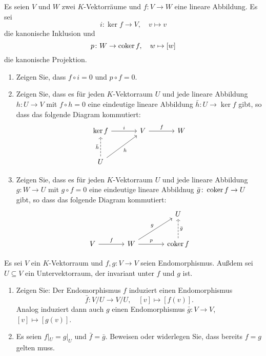 \begin{question}
  Es seien $V$ und $W$ zwei $K$-Vektorräume und $f \colon V \to W$ eine lineare Abbildung.
  Es sei
  \[
    i \colon \ker f \to V,
    \quad
    v \mapsto v
  \]
  die kanonische Inklusion und
  \[
    p \colon W \to \operatorname{coker} f,
    \quad
    w \mapsto [w]
  \]
  die kanonische Projektion.
  \begin{enumerate}[leftmargin=*]
    \item
      Zeigen Sie, dass $f \circ i = 0$ und $p \circ f = 0$.
    \item
      Zeigen Sie, dass es für jeden $K$-Vektorraum $U$ und jede lineare Abbildung $h \colon U \to V$ mit $f \circ h = 0$ eine eindeutige lineare Abbildung $\bar{h} \colon U \to \ker f$ gibt, so dass das folgende Diagram kommutiert:
      \[
        \begin{tikzcd}[row sep = large, column sep = large, ampersand replacement = \&]
                \ker f  \arrow{r}{i}
            \&  V       \arrow{r}{f}
            \&  W
          \\
                U       \arrow[swap]{ru}{h}
                        \arrow[dashed]{u}{\bar{h}}
            \&  {}
            \&  {}
        \end{tikzcd}
      \]
    \item
      Zeigen Sie, dass es für jeden $K$-Vektorraum $U$ und jede lineare Abbildung $g \colon W \to U$ mit $g \circ f = 0$ eine eindeutige lineare Abbildnug $\bar{g} \colon \operatorname{coker} f \to U$ gibt, so dass das folgende Diagram kommutiert:
      \[
        \begin{tikzcd}[row sep = large, column sep = large, ampersand replacement = \&]
                {}
            \&  {}
            \&  U
          \\
                V         \arrow{r}{f}
            \&  W         \arrow{r}{p}
                          \arrow{ru}{g}
            \&  \coker f  \arrow[swap, dashed]{u}{\bar{g}}
        \end{tikzcd}
      \]
  \end{enumerate}
\end{question}


\begin{question}
  Es sei $V$ ein $K$-Vektorraum und $f, g \colon V \to V$ seien Endomorphismus.
  Außdem sei $U \subseteq V$ ein Untervektorraum, der invariant unter $f$ und $g$ ist.
  \begin{enumerate}[leftmargin=*]
    \item
      Zeigen Sie: Der Endomorphismus $f$ induziert einen Endomorphismus
      \[
        \bar{f} \colon V\!/U \to V\!/U,
        \quad
        [v] \mapsto [f(v)].
      \]
      Analog induziert dann auch $g$ einen Endomorphismus $\bar{g} \colon V \to V$, $[v] \mapsto [g(v)]$.
    \item
      Es seien $f|_U = g|_U$ und $\bar{f} = \bar{g}$.
      Beweisen oder widerlegen Sie, dass bereits $f = g$ gelten muss.
  \end{enumerate}
\end{question}